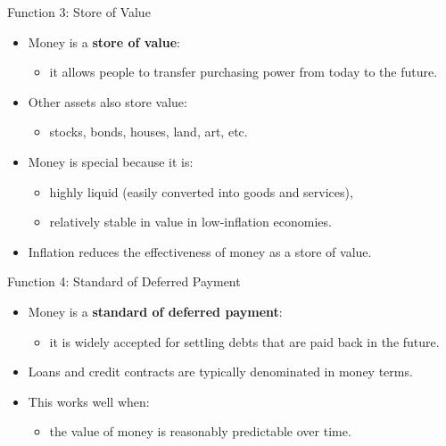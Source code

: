 \documentclass[aspectratio=169]{beamer}
\begin{document}
\begin{frame}{Function 3: Store of Value}
\transfade
\begin{itemize}
  \item Money is a \textbf{store of value}:
  \begin{itemize}
    \item it allows people to transfer purchasing power from today to the future.
  \end{itemize}
  \item Other assets also store value:
  \begin{itemize}
    \item stocks, bonds, houses, land, art, etc.
  \end{itemize}
  \item Money is special because it is:
  \begin{itemize}
    \item highly \alert{liquid} (easily converted into goods and services),
    \item relatively stable in value in low-inflation economies.
  \end{itemize}
  \item Inflation reduces the effectiveness of money as a store of value.
\end{itemize}
\end{frame}

\begin{frame}{Function 4: Standard of Deferred Payment}
\transfade
\begin{itemize}
  \item Money is a \textbf{standard of deferred payment}:
  \begin{itemize}
    \item it is widely accepted for settling debts that are paid back in the future.
  \end{itemize}
  \item Loans and credit contracts are typically denominated in money terms.
  \item This works well when:
  \begin{itemize}
    \item the value of money is reasonably \alert{predictable} over time.
  \end{itemize}
\end{itemize}
\end{frame}
\end{document}
